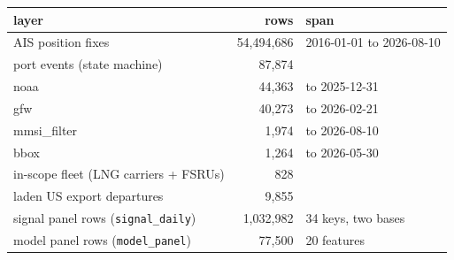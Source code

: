 \begin{tabular}{lrl}
\toprule
layer & rows & span \\
\midrule
AIS position fixes & 54,494,686 & 2016-01-01 to 2026-08-10 \\
port events (state machine) & 87,874 & \\
  \quad noaa & 44,363 & to 2025-12-31 \\
  \quad gfw & 40,273 & to 2026-02-21 \\
  \quad mmsi\_filter & 1,974 & to 2026-08-10 \\
  \quad bbox & 1,264 & to 2026-05-30 \\
in-scope fleet (LNG carriers + FSRUs) & 828 & \\
laden US export departures & 9,855 & \\
signal panel rows (\texttt{signal\_daily}) & 1,032,982 & 34 keys, two bases \\
model panel rows (\texttt{model\_panel}) & 77,500 & 20 features \\
\bottomrule
\end{tabular}
